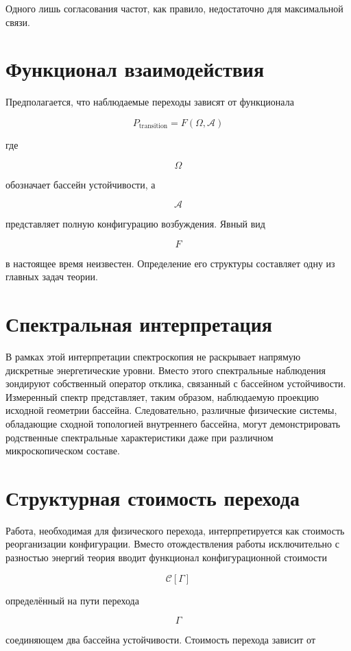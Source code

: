 Одного лишь согласования частот, как правило, недостаточно для максимальной связи.

\section{Функционал взаимодействия}

Предполагается, что наблюдаемые переходы зависят от функционала

\[ \boxed{ P_{\mathrm{transition}} = F(\Omega,\mathcal A) } \]

где

\[ \Omega \]

обозначает бассейн устойчивости, а

\[ \mathcal A \]

представляет полную конфигурацию возбуждения. Явный вид

\[ F \]

в настоящее время неизвестен. Определение его структуры составляет одну из главных задач теории.

\section{Спектральная интерпретация}

В рамках этой интерпретации спектроскопия не раскрывает напрямую дискретные энергетические уровни. Вместо этого спектральные наблюдения зондируют собственный оператор отклика, связанный с бассейном устойчивости. Измеренный спектр представляет, таким образом, наблюдаемую проекцию исходной геометрии бассейна. Следовательно, различные физические системы, обладающие сходной топологией внутреннего бассейна, могут демонстрировать родственные спектральные характеристики даже при различном микроскопическом составе.

\section{Структурная стоимость перехода}

Работа, необходимая для физического перехода, интерпретируется как стоимость реорганизации конфигурации. Вместо отождествления работы исключительно с разностью энергий теория вводит функционал конфигурационной стоимости

\[ \boxed{ \mathcal C[\Gamma] } \]

определённый на пути перехода

\[ \Gamma \]

соединяющем два бассейна устойчивости. Стоимость перехода зависит от

